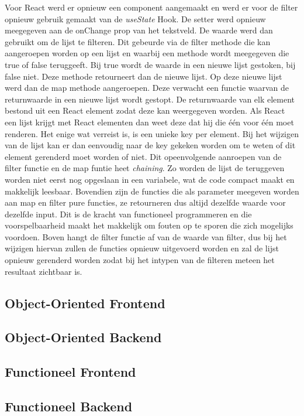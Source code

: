 Voor React werd er opnieuw een component aangemaakt en werd er voor de filter opnieuw gebruik gemaakt van de \textit{useState} Hook. De setter werd opnieuw meegegeven aan de onChange prop van het tekstveld. De waarde werd dan gebruikt om de lijst te filteren. Dit gebeurde via de filter methode die kan aangeroepen worden op een lijst en waarbij een methode wordt meegegeven die true of false teruggeeft. Bij true wordt de waarde in een nieuwe lijst gestoken, bij false niet. Deze methode retourneert dan de nieuwe lijst. Op deze nieuwe lijst werd dan de map methode aangeroepen. Deze verwacht een functie waarvan de returnwaarde in een nieuwe lijst wordt gestopt. De returnwaarde van elk element bestond uit een React element zodat deze kan weergegeven worden. Als React een lijst krijgt met React elementen dan weet deze dat hij die één voor één moet renderen. Het enige wat verreist is, is een unieke key per element. Bij het wijzigen van de lijst kan er dan eenvoudig naar de key gekeken worden om te weten of dit element gerenderd moet worden of niet. Dit opeenvolgende aanroepen van de filter functie en de map funtie heet \textit{chaining}. Zo worden de lijst de teruggeven worden niet eerst nog opgeslaan in een variabele, wat de code compact maakt en makkelijk leesbaar. Bovendien zijn de functies die als parameter meegeven worden aan map en filter pure functies, ze retourneren dus altijd dezelfde waarde voor dezelfde input. Dit is de kracht van functioneel programmeren en die voorspelbaarheid maakt het makkelijk om fouten op te sporen die zich mogelijks voordoen. Boven hangt de filter functie af van de waarde van filter, dus bij het wijzigen hiervan zullen de functies opnieuw uitgevoerd worden en zal de lijst opnieuw gerenderd worden zodat bij het intypen van de filteren meteen het resultaat zichtbaar is.

\subsection{Object-Oriented Frontend}
\subsection{Object-Oriented Backend}
\subsection{Functioneel Frontend}
\subsection{Functioneel Backend}